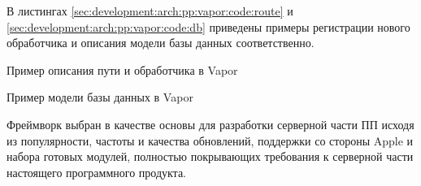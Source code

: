 В листингах \ref{sec:development:arch:pp:vapor:code:route} и \ref{sec:development:arch:pp:vapor:code:db} приведены примеры регистрации нового обработчика и описания модели базы данных соответственно.

\begin{code}
	
   \caption{Пример описания пути и обработчика в Vapor}
   \label{sec:development:arch:pp:vapor:code:route}
\end{code}

\begin{code}
	
   \caption{Пример модели базы данных в Vapor}
   \label{sec:development:arch:pp:vapor:code:db}
\end{code}

Фреймворк выбран в качестве основы для разработки серверной части ПП исходя из популярности, частоты и качества обновлений, поддержки со стороны Apple и набора готовых модулей, полностью покрывающих требования к серверной части настоящего программного продукта.